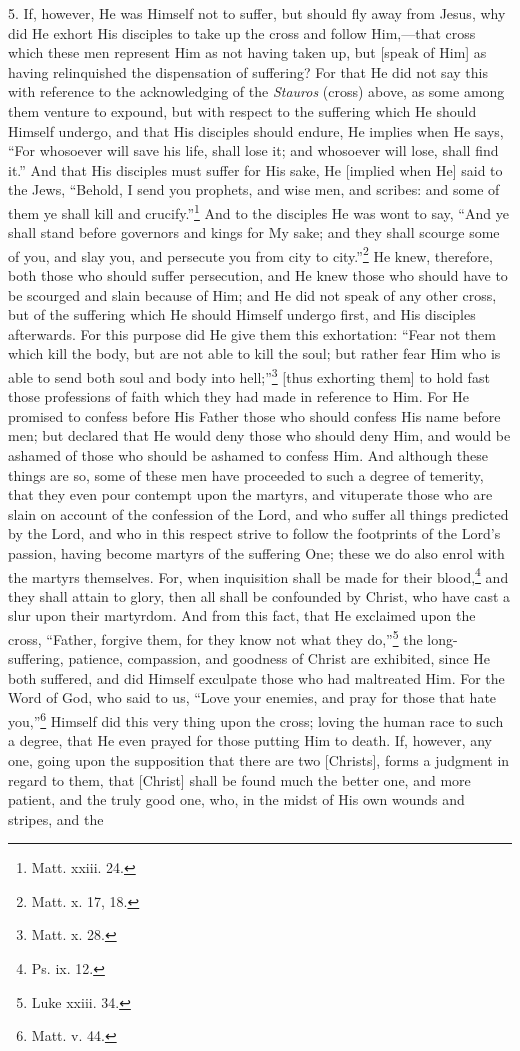 5. If, however, He was Himself not to suffer, but should fly away from Jesus, why did He exhort His disciples to take up the cross and follow Him,—that cross which these men represent Him as not having taken up, but [speak of Him] as having relinquished the dispensation of suffering? For that He did not say this with reference to the acknowledging of the \emph{Stauros} (cross) above, as some among them venture to expound, but with respect to the suffering which He should Himself undergo, and that His disciples should endure, He implies when He says, “For whosoever will save his life, shall lose it; and whosoever will lose, shall find it.” And that His disciples must suffer for His sake, He [implied when He] said to the Jews, “Behold, I send you prophets, and wise men, and scribes: and some of them ye shall kill and crucify.”\footnote{Matt. xxiii. 24.} And to the disciples He was wont to say, “And ye shall stand before governors and kings for My sake; and they shall scourge some of you, and slay you, and persecute you from city to city.”\footnote{Matt. x. 17, 18.} He knew, therefore, both those who should suffer persecution, and He knew those who should have to be scourged and slain because of Him; and He did not speak of any other cross, but of the suffering which He should Himself undergo first, and His disciples afterwards. For this purpose did He give them this exhortation: “Fear not them which kill the body, but are not able to kill the soul; but rather fear Him who is able to send both soul and body into hell;”\footnote{Matt. x. 28.} [thus exhorting them] to hold fast those professions of faith which they had made in reference to Him. For He promised to confess before His Father those who should confess His name before men; but declared that He would deny those who should deny Him, and would be ashamed of those who should be ashamed to confess Him. And although these things are so, some of these men have proceeded to such a degree of temerity, that they even pour contempt upon the martyrs, and vituperate those who are slain on account of the confession of the Lord, and who suffer all things predicted by the Lord, and who in this respect strive to follow the footprints of the Lord’s passion, having become martyrs of the suffering One; these we do also enrol with the martyrs themselves. For, when inquisition shall be made for their blood,\footnote{Ps. ix. 12.} and they shall attain to glory, then all shall be confounded by Christ, who have cast a slur upon their martyrdom. And from this fact, that He exclaimed upon the cross, “Father, forgive them, for they know not what they do,”\footnote{Luke xxiii. 34.} the long-suffering, patience, compassion, and goodness of Christ are exhibited, since He both suffered, and did Himself exculpate those who had maltreated Him. For the Word of God, who said to us, “Love your enemies, and pray for those that hate you,”\footnote{Matt. v. 44.} Himself did this very thing upon the cross; loving the human race to such a degree, that He even prayed for those putting Him to death. If, however, any one, going upon the supposition that there are two [Christs], forms a judgment in regard to them, that [Christ] shall be found much the better one, and more patient, and the truly good one, who, in the midst of His own wounds and stripes, and the 